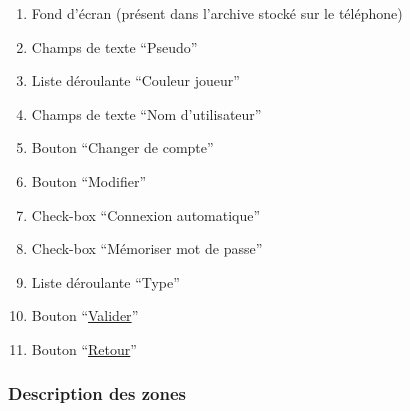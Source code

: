 \documentclass{report}
\begin{document}
		\begin{enumerate}
		  \item Fond d'écran (présent dans l'archive stocké sur le téléphone)
		  \item Champs de texte ``Pseudo''
		  \item Liste déroulante ``Couleur joueur''
		  \item Champs de texte ``Nom d'utilisateur''
		  \item Bouton ``Changer de compte''
		  \item Bouton ``Modifier''
		  \item Check-box ``Connexion automatique''
		  \item Check-box ``Mémoriser mot de passe''
		  \item Liste déroulante ``Type''
		  \item Bouton ``\hyperlink{Options}{Valider}''
		  \item Bouton ``\hyperlink{Options}{Retour}''
		\end{enumerate}

		\subsubsection{Description des zones}
		
\end{document}
